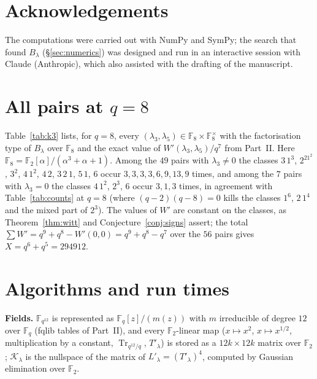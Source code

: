 ﻿\documentclass[12pt,a4paper]{amsart}
\theoremstyle{definition}
\newcommand{\F}{\mathbb{F}}
\newcommand{\Tr}{\operatorname{Tr}}
\newcommand{\Kk}{\mathcal{K}}
\begin{document}
\section*{Acknowledgements}
The computations were carried out with NumPy and SymPy; the search that found $B_\lambda$ (\S\ref{sec:numerics}) was designed and run in an interactive session with Claude (Anthropic), which also assisted with the drafting of the manuscript.

\appendix

\section{All pairs at \texorpdfstring{$q=8$}{q=8}}\label{app:k3}
Table~\ref{tab:k3} lists, for $q=8$, every $(\lambda_3,\lambda_5)\in\F_8\times\F_8^\times$ with the factorisation type of $B_\lambda$ over $\F_8$ and the exact value of $W'(\lambda_3,\lambda_5)/q^7$ from Part~II. Here $\F_8=\F_2[\alpha]/(\alpha^3+\alpha+1)$. Among the $49$ pairs with $\lambda_3\ne0$ the classes $3\,1^3$, $2^21^2$, $3^2$, $4\,1^2$, $4\,2$, $3\,2\,1$, $5\,1$, $6$ occur $3,3,3,3,6,9,13,9$ times, and among the $7$ pairs with $\lambda_3=0$ the classes $4\,1^2$, $2^3$, $6$ occur $3,1,3$ times, in agreement with Table~\ref{tab:counts} at $q=8$ (where $(q-2)(q-8)=0$ kills the classes $1^6$, $2\,1^4$ and the mixed part of $2^3$). The values of $W'$ are constant on the classes, as Theorem~\ref{thm:witt} and Conjecture~\ref{conj:signs} assert; the total $\sum W'=q^9+q^8-W'(0,0)=q^9+q^8-q^7$ over the $56$ pairs gives $X=q^6+q^5=294912$.

\begin{table}[H]
\centering
\caption{$q=8$: all pairs $(\lambda_3,\lambda_5)$, the class of $B_\lambda$ and $W'/q^7$ (generated by \texttt{appendix\_table\_k3.py}).}\label{tab:k3}
\footnotesize

\end{table}

\section{Algorithms and run times}\label{app:algo}
\textbf{Fields.} $\F_{q^{12}}$ is represented as $\F_q[z]/(m(z))$ with $m$ irreducible of degree $12$ over $\F_q$ (fqlib tables of Part~II), and every $\F_2$-linear map ($x\mapsto x^2$, $x\mapsto x^{1/2}$, multiplication by a constant, $\Tr_{q^{12}/q}$, $T'_\lambda$) is stored as a $12k\times12k$ matrix over $\F_2$; $\Kk_\lambda$ is the nullspace of the matrix of $L'_\lambda=(T'_\lambda)^4$, computed by Gaussian elimination over $\F_2$.
\end{document}
